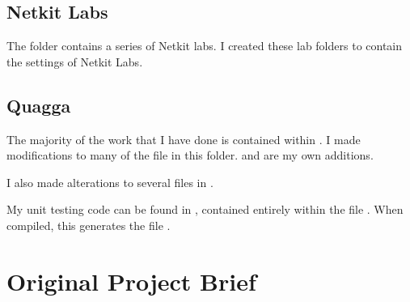 \section*{Netkit Labs}
The folder  contains a series of Netkit labs. I created these lab
folders to contain the settings of Netkit Labs. 

\section*{Quagga}
The majority of the work that I have done is contained within
. I made modifications to many of the file in this
folder.  and  are my own additions. 

I also made alterations to several files in . 

My unit testing code can be found in , contained
entirely within the file . When compiled, this
generates the file .

\chapter{Original Project Brief}



